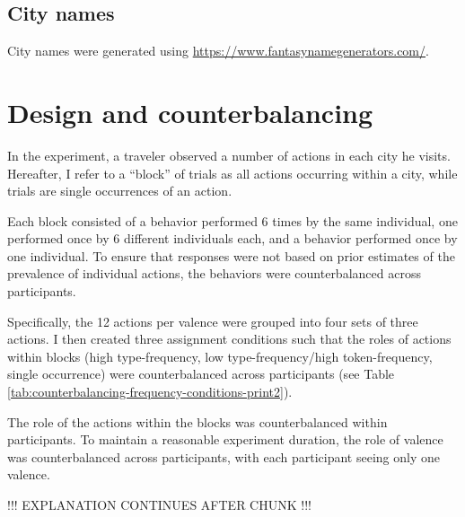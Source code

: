 \documentclass[
]{article}
\begin{document}
\subsection{City names}\label{city-names}

City names were generated using
\url{https://www.fantasynamegenerators.com/}.

\clearpage

\section{Design and counterbalancing}\label{design-and-counterbalancing}

In the experiment, a traveler observed a number of actions in each city
he visits. Hereafter, I refer to a ``block'' of trials as all actions
occurring within a city, while trials are single occurrences of an
action.

Each block consisted of a behavior performed 6 times by the same
individual, one performed once by 6 different individuals each, and a
behavior performed once by one individual. To ensure that responses were
not based on prior estimates of the prevalence of individual actions,
the behaviors were counterbalanced across participants.

Specifically, the 12 actions per valence were grouped into four sets of
three actions. I then created three assignment conditions such that the
roles of actions within blocks (high type-frequency, low
type-frequency/high token-frequency, single occurrence) were
counterbalanced across participants (see Table
\ref{tab:counterbalancing-frequency-conditions-print2}).

The role of the actions within the blocks was counterbalanced within
participants. To maintain a reasonable experiment duration, the role of
valence was counterbalanced across participants, with each participant
seeing only one valence.

!!! EXPLANATION CONTINUES AFTER CHUNK !!!
\end{document}
